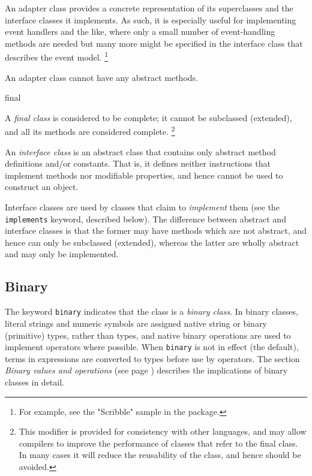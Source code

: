 \begin{description}
An adapter class provides a concrete representation of its superclasses
and the interface classes it implements.  As such, it is especially
useful for implementing event handlers and the like, where only a small
number of event-handling methods are needed but many more might be
specified in the interface class that describes the event model.
\footnote{
For example, see the "Scribble" sample in the \nr{} package.
}
 
An adapter class cannot have any abstract methods.
\item{final}

A \emph{final class} is considered to be complete; it cannot be
subclassed (extended), and all its methods are considered complete.
\footnote{
This modifier is provided for consistency with other languages, and may
allow compilers to improve the performance of classes that refer to the
final class.
In many cases it will reduce the reusability of the class, and hence
should be avoided.
}
\item[interface]\label{refinterf}

An \emph{interface class} is an abstract class that contains only
abstract method definitions and/or constants.  That is, it defines
neither instructions that implement methods nor modifiable properties,
and hence cannot be used to construct an object.
 
Interface classes are used by classes that claim to \emph{implement}
them (see the \texttt{implements} keyword, described below).
The difference between abstract and interface classes is that
the former may have methods which are not abstract, and hence can only
be subclassed (extended), whereas the latter are wholly abstract and
may only be implemented.
\end{description}
\subsection{Binary}\label{refbincla}
 
The keyword \texttt{binary} indicates that the class is a \emph{binary
class}.
In binary classes, literal strings and numeric symbols are assigned
native string or binary (primitive) types, rather than \nr{} types,
and native binary operations are used to implement operators where
possible.
When \texttt{binary} is not in effect (the default), terms in
expressions are converted to \nr{} types before use by operators.
The section  \emph{Binary values and operations} (see page \pageref{refbinary}) 
describes the implications of binary classes in detail.
 

